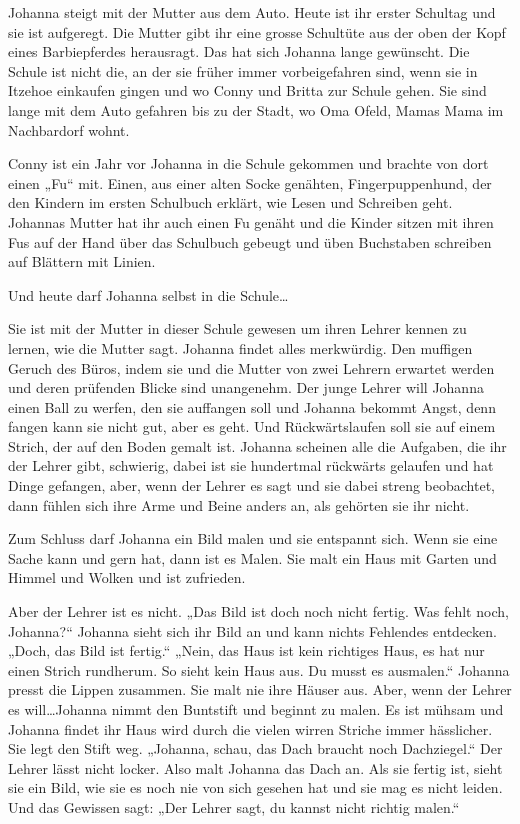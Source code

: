 \documentclass[10pt,a5paper]{book}
\begin{document}
Johanna steigt mit der Mutter aus dem Auto. Heute ist ihr erster Schultag und sie ist aufgeregt. Die Mutter gibt ihr eine grosse Schultüte aus der oben der Kopf eines Barbiepferdes herausragt. Das hat sich Johanna lange gewünscht. Die Schule ist nicht die, an der sie früher immer vorbeigefahren sind, wenn sie in Itzehoe einkaufen gingen und wo Conny und Britta zur Schule gehen. Sie sind lange mit dem Auto gefahren bis zu der Stadt, wo Oma Ofeld, Mamas Mama im Nachbardorf wohnt.

Conny ist ein Jahr vor Johanna in die Schule gekommen und brachte von dort einen „Fu“ mit. Einen, aus einer alten Socke genähten, Fingerpuppenhund, der den Kindern im ersten Schulbuch erklärt, wie Lesen und Schreiben geht. Johannas Mutter hat ihr auch einen Fu genäht und die Kinder sitzen mit ihren Fus auf der Hand über das Schulbuch gebeugt und üben Buchstaben schreiben auf Blättern mit Linien.

Und heute darf Johanna selbst in die Schule\dots

Sie ist mit der Mutter in dieser Schule gewesen um ihren Lehrer kennen zu lernen, wie die Mutter sagt. Johanna findet alles merkwürdig. Den muffigen Geruch des Büros, indem sie und die Mutter von zwei Lehrern erwartet werden und deren prüfenden Blicke sind unangenehm. Der junge Lehrer will Johanna einen Ball zu werfen, den sie auffangen soll und Johanna bekommt Angst, denn fangen kann sie nicht gut, aber es geht. Und Rückwärtslaufen soll sie auf einem Strich, der auf den Boden gemalt ist. Johanna scheinen alle die Aufgaben, die ihr der Lehrer gibt, schwierig, dabei ist sie hundertmal rückwärts gelaufen und hat Dinge gefangen, aber, wenn der Lehrer es sagt und sie dabei streng beobachtet, dann fühlen sich ihre Arme und Beine anders an, als gehörten sie ihr nicht.

Zum Schluss darf Johanna ein Bild malen und sie entspannt sich. Wenn sie eine Sache kann und gern hat, dann ist es Malen. Sie malt ein Haus mit Garten und Himmel und Wolken und ist zufrieden. 

Aber der Lehrer ist es nicht. „Das Bild ist doch noch nicht fertig. Was fehlt noch, Johanna?“  Johanna sieht sich ihr Bild an und kann nichts Fehlendes entdecken. „Doch, das Bild ist fertig.“ „Nein, das Haus ist kein richtiges Haus, es hat nur einen Strich rundherum. So sieht kein Haus aus. Du musst es ausmalen.“ Johanna presst die Lippen zusammen. Sie malt nie ihre Häuser aus. Aber, wenn der Lehrer es will\dots Johanna nimmt den Buntstift und beginnt zu malen. Es ist mühsam und Johanna findet ihr Haus wird durch die vielen wirren Striche immer hässlicher. Sie legt den Stift weg. „Johanna, schau, das Dach braucht noch Dachziegel.“ Der Lehrer lässt nicht locker. Also malt Johanna das Dach an. Als sie fertig ist, sieht sie ein Bild, wie sie es noch nie von sich gesehen hat und sie mag es nicht leiden. Und das Gewissen sagt: „Der Lehrer sagt, du kannst nicht richtig malen.“
\end{document}
